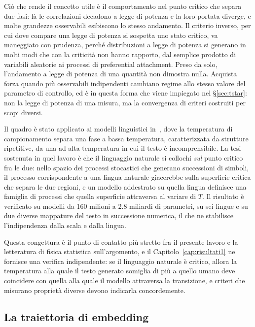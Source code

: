 Ciò che rende il concetto utile è il comportamento nel punto critico che
separa due fasi: là le correlazioni decadono a legge di potenza e la loro
portata diverge, e molte grandezze osservabili esibiscono lo stesso andamento.
Il criterio inverso, per cui dove compare una legge di potenza si sospetta uno
stato critico, va maneggiato con prudenza, perché distribuzioni a legge di
potenza si generano in molti modi che con la criticità non hanno rapporto, dal
semplice prodotto di variabili aleatorie ai processi di preferential
attachment. Preso da solo, l'andamento a legge di potenza di una quantità non
dimostra nulla. Acquista forza quando più osservabili indipendenti cambiano
regime allo stesso valore del parametro di controllo, ed è in questa forma che
viene impiegato nel §\ref{sec:tstar}: non la legge di potenza di una misura,
ma la convergenza di criteri costruiti per scopi diversi.

Il quadro è stato applicato ai modelli linguistici in~\cite{nakaishi2024}, dove
la temperatura di campionamento separa una fase a bassa temperatura,
caratterizzata da strutture ripetitive, da una ad alta temperatura in cui il
testo è incomprensibile. La tesi sostenuta in quel lavoro è che il linguaggio
naturale si collochi \emph{sul} punto critico fra le due: nello spazio dei
processi stocastici che generano successioni di simboli, il processo
corrispondente a una lingua naturale giacerebbe sulla superficie critica che
separa le due regioni, e un modello addestrato su quella lingua definisce una
famiglia di processi che quella superficie attraversa al variare di $T$. Il
risultato è verificato su modelli da 160 milioni a 2.8 miliardi di parametri, su
sei lingue e su due diverse mappature del testo in successione numerica, il che
ne stabilisce l'indipendenza dalla scala e dalla lingua.

Questa congettura è il punto di contatto più stretto fra il presente lavoro e la
letteratura di fisica statistica sull'argomento, e il
Capitolo~\ref{cap:risultati1} ne fornisce una verifica indipendente: se il
linguaggio naturale è critico, allora la temperatura alla quale il testo
generato somiglia di più a quello umano deve coincidere con quella alla quale il
modello attraversa la transizione, e criteri che misurano proprietà diverse
devono indicarla concordemente.


\subsection{La traiettoria di embedding}
\label{sec:traiettoria}


